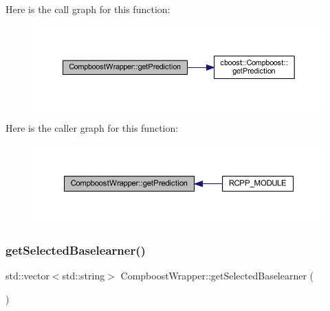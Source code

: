 Here is the call graph for this function\+:\nopagebreak
\begin{figure}[H]
\begin{center}
\leavevmode
\includegraphics[width=350pt]{class_compboost_wrapper_ad0340d006f55b3278b670363ad90d545_cgraph}
\end{center}
\end{figure}
Here is the caller graph for this function\+:\nopagebreak
\begin{figure}[H]
\begin{center}
\leavevmode
\includegraphics[width=350pt]{class_compboost_wrapper_ad0340d006f55b3278b670363ad90d545_icgraph}
\end{center}
\end{figure}
\mbox{\label{class_compboost_wrapper_aa5313de3cf62b93286a67f266b605443}} 
\subsubsection{\texorpdfstring{get\+Selected\+Baselearner()}{getSelectedBaselearner()}}
{\footnotesize\ttfamily std\+::vector$<$std\+::string$>$ Compboost\+Wrapper\+::get\+Selected\+Baselearner (\begin{DoxyParamCaption}{ }\end{DoxyParamCaption})\hspace{0.3cm}{\ttfamily [inline]}}


